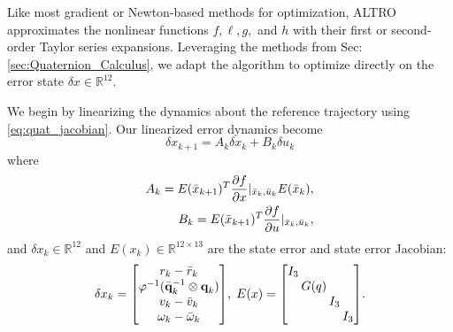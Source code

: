 \documentclass[letterpaper, 10 pt, conference]{ieeeconf}  %
\newcommand{\R}{\mathbb{R}}
\newcommand{\q}{\textbf{q}}
\begin{document}
    Like most gradient or Newton-based methods for optimization, ALTRO approximates the 
    nonlinear functions $f, \ell, g,$ and $h$ with their first or second-order Taylor series
    expansions. Leveraging the methods from Sec: \ref{sec:Quaternion_Calculus}, we adapt the
    algorithm to optimize directly on the error state $\delta x \in \R^{12}$. 

    We begin by linearizing the dynamics about the reference trajectory using
    \eqref{eq:quat_jacobian}. Our linearized error dynamics become
    \begin{equation} \label{eq:linearized_dynamics}
        \delta x_{k+1} = A_k \delta x_k + B_k \delta u_k 
    \end{equation}
    where \begin{equation}
        \begin{aligned}
            A_k = E(\bar{x}_{k+1})^T \pdv{f}{x}|_{\bar{x}_k,\bar{u}_k} E(\bar{x}_k), \\
            B_k = E(\bar{x}_{k+1})^T \pdv{f}{u}|_{\bar{x}_k,\bar{u}_k},
        \end{aligned}
    \end{equation}
    and $\delta x_k \in \R^{12}$ and $E(x_k) \in \R^{12 \times 13}$ are the state error and state error Jacobian:
    \begin{equation} \label{eq:state_error}
        \setlength\arraycolsep{1pt}
        \delta x_k = \begin{bmatrix} 
            r_k - \bar{r}_k \\ \varphi^{-1}(\bar{\q}_k^{-1} \otimes \q_k) \\ v_k - \bar{v}_k \\ \omega_k - \bar{\omega}_k 
        \end{bmatrix}\!, \;
        E(x) = \begin{bmatrix}
            I_3 & & & \\
            & G(q) & & \\
            & & I_3 & \\
            & & & I_3 \\
        \end{bmatrix}\!.
    \end{equation}
    
\end{document}
